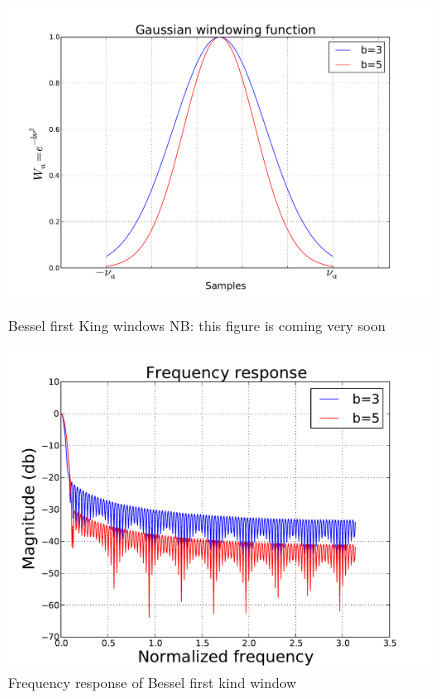 \documentclass[useAMS,usenatbib]{mn2e}
\begin{document}
\begin{figure}
  \centering
\begin{minipage}{0.36\linewidth}\includegraphics[width=1\textwidth]{./Figures/gausian.pdf}\caption{Bessel 
first King windows NB: this figure is coming very soon}\label{fig:fig_4}\end{minipage}
\begin{minipage}{0.36\linewidth}\includegraphics[width=1\textwidth]{./Figures/freq_resp_gaussian.pdf}\caption{Frequency 
response of Bessel first kind window}\label{fig:fig_5} \end {minipage}
\end{figure}
\end{document}
